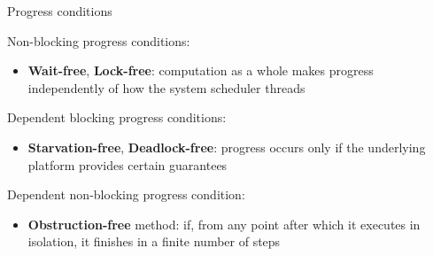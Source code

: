 \begin{frame}[t,noframenumbering]{Progress conditions}

Non-blocking progress conditions:
\begin{itemize}
  \item \textbf{Wait-free}, \textbf{Lock-free}: computation as a whole makes progress independently of how the system scheduler threads
\end{itemize}

Dependent blocking progress conditions:
\begin{itemize}
  \item \textbf{Starvation-free}, \textbf{Deadlock-free}: progress occurs only if the underlying platform provides certain guarantees
\end{itemize}


\pause
Dependent non-blocking progress condition:
\begin{itemize}
  \item \textbf{Obstruction-free} method: if, from any point after which it executes in isolation, it finishes in a finite number of steps
\end{itemize}

\end{frame}




